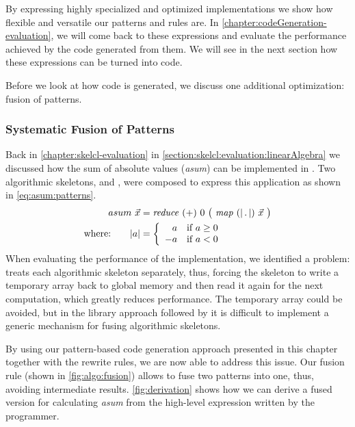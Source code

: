 By expressing highly specialized and optimized implementations we show how flexible and versatile our patterns and rules are.
In \autoref{chapter:codeGeneration-evaluation}, we will come back to these expressions and evaluate the performance achieved by the \OpenCL code generated from them.
We will see in the next section how these expressions can be turned into \OpenCL code.

\bigskip


Before we look at how \OpenCL code is generated, we discuss one additional optimization: fusion of patterns.















\subsubsection{Systematic Fusion of Patterns}
Back in \autoref{chapter:skelcl-evaluation} in \autoref{section:skelcl:evaluation:linearAlgebra} we discussed how the sum of absolute values (\emph{asum}) can be implemented in \SkelCL.
Two algorithmic skeletons, \reduce and \map, were composed to express this application as shown in \autoref{eq:asum:patterns}.
\begin{align}
  asum\ \vec{x} &= \reduce\ (+)\ 0\ \big(\ \map\ (|\, .\, |)\ \vec{x}\ \big)\label{eq:asum:patterns}\\
  \text{where:} \qquad | a | &=
    \left\{
      \begin{array}{r l}
      a & \text{if } a \geq 0\\
      -a & \text{if } a < 0
      \end{array}
    \right.\nonumber
\end{align}
%
When evaluating the performance of the \SkelCL implementation, we identified a problem:
\SkelCL treats each algorithmic skeleton separately, thus, forcing the \map skeleton to write a temporary array back to global memory and then read it again for the next computation, which greatly reduces performance.
The temporary array could be avoided, but in the library approach followed by \SkelCL it is difficult to implement a generic mechanism for fusing algorithmic skeletons.


By using our pattern-based code generation approach presented in this chapter together with the rewrite rules, we are now able to address this issue.
Our fusion rule (shown in \autoref{fig:algo:fusion}) allows to fuse two patterns into one, thus, avoiding intermediate results.
\autoref{fig:derivation} shows how we can derive a fused version for calculating \emph{asum} from the high-level expression written by the programmer.

